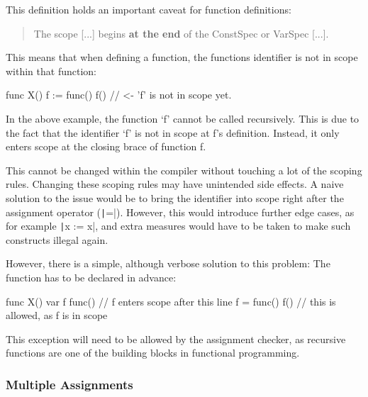 This definition holds an important caveat for function definitions:
\begin{quote}
    The scope [...] begins \textbf{at the end} of the ConstSpec or VarSpec [...].
\end{quote}

This means that when defining a function, the functions identifier is not
in scope within that function:

\begin{code}
\begin{gocode}
func X() {
	f := func() {
		f() // <- 'f' is not in scope yet.
	}
}
\end{gocode}
\end{code}
In the above example, the function `f' cannot be called recursively. This is due
to the fact that the identifier `f' is not in scope at f's definition. Instead,
it only enters scope at the closing brace of function f.

This cannot be changed within the compiler without touching a lot of the scoping
rules. Changing these scoping rules may have unintended side effects. A naive
solution to the issue would be to bring the identifier into scope right after the
assignment operator (\texttt|=|). However, this would introduce further
edge cases, as for example \texttt|x := x|, and extra measures would have
to be taken to make such constructs illegal again.

However, there is a simple, although verbose solution to this problem: The function
has to be declared in advance:

\begin{code}
	\begin{gocode}
func X() {
	var f func() // f enters scope after this line
	f = func() {
		f() // this is allowed, as f is in scope
	}
}
\end{gocode}
\end{code}
This exception will need to be allowed by the assignment checker, as recursive functions
are one of the building blocks in functional programming.

\subsubsection{Multiple Assignments}\label{sec:multi-assign}



